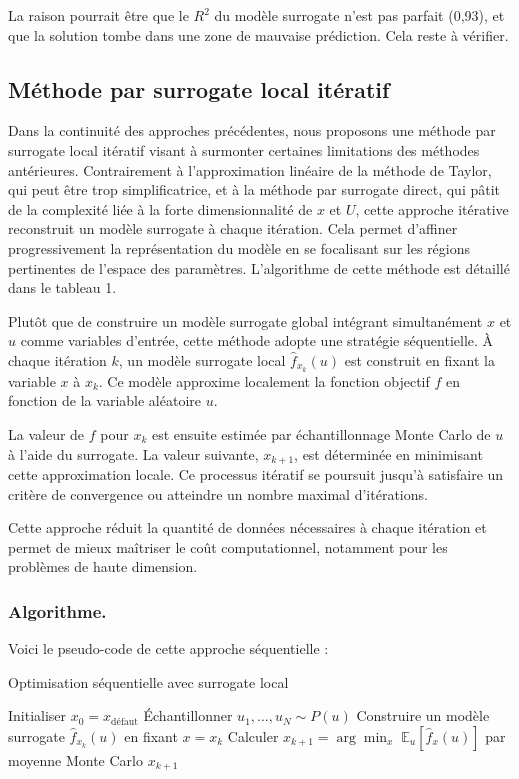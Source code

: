 \documentclass[a4paper, 11pt]{article}
\begin{document}
La raison pourrait être que le $R^{2}$ du modèle surrogate n’est pas parfait (0,93), et que la solution tombe dans une zone de mauvaise prédiction. Cela reste à vérifier.




\subsection{Méthode par surrogate local itératif}
Dans la continuité des approches précédentes, nous proposons une méthode par surrogate local itératif visant à surmonter certaines limitations des méthodes antérieures. Contrairement à l’approximation linéaire de la méthode de Taylor, qui peut être trop simplificatrice, et à la méthode par surrogate direct, qui pâtit de la complexité liée à la forte dimensionnalité de $x$ et $U$, cette approche itérative reconstruit un modèle surrogate à chaque itération. Cela permet d’affiner progressivement la représentation du modèle en se focalisant sur les régions pertinentes de l’espace des paramètres. L’algorithme de cette méthode est détaillé dans le tableau 1.

Plutôt que de construire un modèle surrogate global intégrant simultanément $x$ et $u$ comme variables d’entrée, cette méthode adopte une stratégie séquentielle. À chaque itération $k$, un modèle surrogate local $\hat{f}_{x_k}(u)$ est construit en fixant la variable $x$ à $x_k$. Ce modèle approxime localement la fonction objectif $f$ en fonction de la variable aléatoire $u$.

La valeur de $f$ pour $x_k$ est ensuite estimée par échantillonnage Monte Carlo de $u$ à l’aide du surrogate. La valeur suivante, $x_{k+1}$, est déterminée en minimisant cette approximation locale. Ce processus itératif se poursuit jusqu’à satisfaire un critère de convergence ou atteindre un nombre maximal d’itérations.

Cette approche réduit la quantité de données nécessaires à chaque itération et permet de mieux maîtriser le coût computationnel, notamment pour les problèmes de haute dimension.
\vspace{0.5em}
\subsubsection{Algorithme.}
Voici le pseudo-code de cette approche séquentielle :

\begin{algorithm}[H]
\caption{Optimisation séquentielle avec surrogate local}
\begin{algorithmic}[1]
    \State Initialiser $x_0 = x_{\text{défaut}}$
        \State Échantillonner $u_1, \dots, u_N \sim P(u)$
        \State Construire un modèle surrogate $\hat{f}_{x_k}(u)$ en fixant $x = x_k$
        \State Calculer $x_{k+1} = \arg\min_x \; \mathbb{E}_{u} \left[ \hat{f}_x(u) \right]$ par moyenne Monte Carlo
    \EndWhile
    \State \Return $x_{k+1}$
\end{algorithmic}
\end{algorithm}
\end{document}
